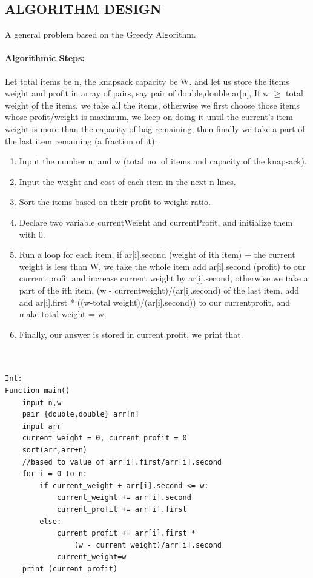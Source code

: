 \documentclass[10pt]{article}
\begin{document}
\begin{multicols*}{2}
\section*{ALGORITHM DESIGN}
A general problem based on the Greedy Algorithm.

\paragraph{Algorithmic Steps:}

Let total items be n, the knapsack capacity be W. and let us store the items weight and profit in array of pairs, say pair of double,double ar[n], If w $\geq$ total weight of the items, we take all the items, otherwise we first choose those items whose profit/weight is maximum, we keep on doing it until the current's item weight is more than the capacity of bag remaining, then finally we take a part of the last item remaining (a fraction of it).
\begin{enumerate}

\item	Input the number n, and w (total no. of items and capacity of the knapsack).
\item	Input the weight and cost of each item in the next n lines.
\item   Sort the items based on their profit to weight ratio.
\item	Declare two variable currentWeight and currentProfit, and initialize them with 0.
\item	Run a loop for each item, if ar[i].second (weight of ith item) + the current weight is less than W, we take the whole item add ar[i].second (profit) to our current profit and increase current weight by ar[i].second, otherwise we take a part of the ith item, (w - currentweight)/(ar[i].second) of the last item, add add ar[i].first * ((w-total weight)/(ar[i].second)) to our currentprofit, and make total weight = w.
\item	Finally, our answer is stored in current profit, we print that.
\\\
\end{enumerate}


\begin{lstlisting}

Int:
Function main()
    input n,w
    pair {double,double} arr[n]
    input arr
    current_weight = 0, current_profit = 0
    sort(arr,arr+n) 
    //based to value of arr[i].first/arr[i].second
    for i = 0 to n:
        if current_weight + arr[i].second <= w:
            current_weight += arr[i].second
            current_profit += arr[i].first
        else:
            current_profit += arr[i].first * 
                (w - current_weight)/arr[i].second
            current_weight=w
    print (current_profit)


\end{lstlisting}
\end{multicols*}
\end{document}

